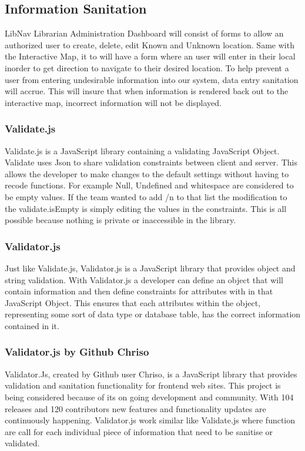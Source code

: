 \documentclass[letterpaper,10pt,titlepage, onecolumn, compsoc]{IEEEtran}
\begin{document}
\subsection{Information Sanitation}
LibNav Librarian Administration Dashboard will consist of forms to allow an authorized user to create, delete, edit Known and Unknown location. Same with the Interactive Map, it to will have a form where an user will enter in their local inorder to get direction to navigate to their desired location. To help prevent a user from entering undesirable information into our system, data entry sanitation will accrue. This will insure that when information is rendered back out to the interactive map, incorrect information will not be displayed.

\subsubsection{Validate.js}
Validate.js is a JavaScript library containing a validating JavaScript Object. Validate uses Json to share validation constraints between client and server. This allows the developer to make changes to the default settings without having to recode functions. For example Null, Undefined and whitespace are considered to be empty values. If the team wanted to add /n to that list the modification to the validate.isEmpty is simply editing the values in the constraints. This is all possible because nothing is private or inaccessible in the library.\cite{validate.js2016}

\subsubsection{Validator.js}
Just like Validate.js, Validator.js is a JavaScript library that provides object and string validation. With Validator.js a developer can define an object that will contain information and then define constraints for attributes  with in that JavaScript Object. This ensures that each attributes within the object, representing some sort of data type or database table, has the correct information contained in it. \cite{validator.js2016}

\subsubsection{Validator.js by Github Chriso}
Validator.Js, created by Github user Chriso, is a JavaScript library that provides validation and sanitation functionality for frontend web sites. This project is being considered because of its on going development and community. With 104 releases and 120 contributors new features and functionality updates are continuously happening. Validator.js work similar like Validate.js where function are call for each individual piece of information that need to be sanitise or validated. \cite{chriso2016}
\end{document}
